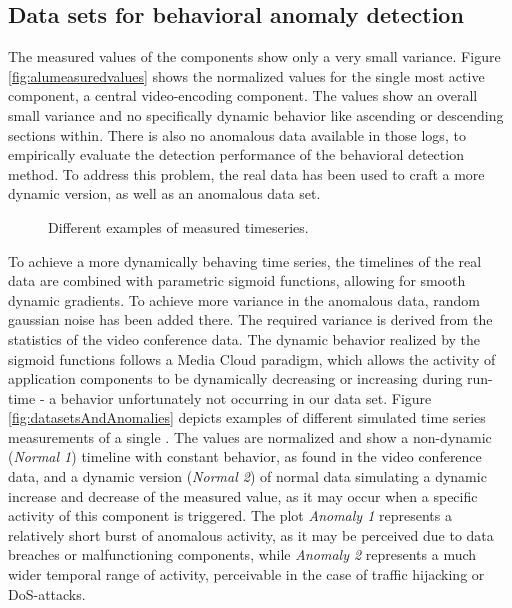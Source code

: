 \documentclass{llncs}
\begin{document}
\subsection{Data sets for behavioral anomaly detection}
\label{subsec:datasets_behavioral}
The measured values of the components show only a very small variance. Figure \ref{fig:alumeasuredvalues} shows the normalized values for the single most active component, a central video-encoding component. The values show an overall small variance and no specifically dynamic behavior like ascending or descending sections within. There is also no anomalous data available in those logs, to empirically evaluate the detection performance of the behavioral detection method. To address this problem, the real data has been used to craft a more dynamic version, as well as an anomalous data set.

\begin{figure}
\vspace{-4mm}
\hfill
{}
\caption{Different examples of measured timeseries.}
\vspace{-2mm}
\end{figure}

To achieve a more dynamically behaving time series, the timelines of the real data are combined with parametric sigmoid functions, allowing for smooth dynamic gradients. To achieve more variance in the anomalous data, random gaussian noise has been added there. The required variance is derived from the statistics of the video conference data. The dynamic behavior realized by the sigmoid functions follows a Media Cloud paradigm, which allows the activity of application components to be dynamically decreasing or increasing during run-time - a behavior unfortunately not occurring in our data set. Figure \ref{fig:datasetsAndAnomalies} depicts examples of different simulated time series measurements of a single . The values are normalized and show a non-dynamic (\textit{Normal 1}) timeline with constant behavior, as found in the video conference data, and a dynamic version (\textit{Normal 2}) of normal data simulating a dynamic increase and decrease of the measured value, as it may occur when a specific activity of this component is triggered. The plot \textit{Anomaly 1} represents a relatively short burst of anomalous activity, as it may be perceived due to data breaches or malfunctioning components, while \textit{Anomaly 2} represents a much wider temporal range of activity, perceivable in the case of traffic hijacking or DoS-attacks.
 
\end{document}
